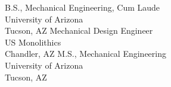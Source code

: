  {B.S., Mechanical Engineering, Cum Laude\\ University of Arizona\\ Tucson, AZ}
 {Mechanical Design Engineer \\ US Monolithics \\ Chandler, AZ}
 {M.S., Mechanical Engineering \\ University of Arizona \\ Tucson, AZ}




